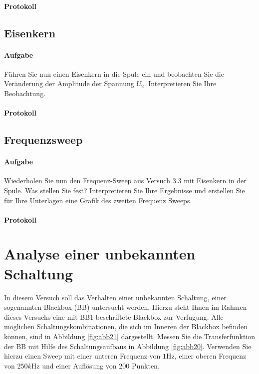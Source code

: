 \documentclass[10pt]{report}
\begin{document}
        \paragraph{Protokoll}


        \subsection{Eisenkern}
        \paragraph{Aufgabe}
        Führen Sie nun einen Eisenkern in die Spule ein und beobachten Sie die Veränderung
        der Amplitude der Spannung $U_2$. Interpretieren Sie Ihre Beobachtung.

        \paragraph{Protokoll}


        \subsection{Frequenzsweep}
        \paragraph{Aufgabe}
        Wiederholen Sie nun den Frequenz-Sweep aus Versuch 3.3 mit Eisenkern in der
        Spule. Was stellen Sie fest? Interpretieren Sie Ihre Ergebnisse und erstellen Sie für
        Ihre Unterlagen eine Grafik des zweiten Frequenz Sweeps.

        \paragraph{Protokoll}


        \section{Analyse einer unbekannten Schaltung}
        In diesem Versuch soll das Verhalten einer unbekannten Schaltung, einer sogenannten
        Blackbox (BB) untersucht werden. Hierzu steht Ihnen im Rahmen dieses Versuchs eine
        mit BB1 beschriftete Blackbox zur Verfugung. Alle möglichen Schaltungskombinationen,
        die sich im Inneren der Blackbox befinden können, sind in Abbildung \ref{fig:abb21} dargestellt.
        Messen Sie die Transferfunktion der BB mit Hilfe des Schaltungsaufbaus in Abbildung
        \ref{fig:abb20}. Verwenden Sie hierzu einen Sweep mit einer unteren Frequenz von $1\si{\hertz}$, einer oberen
        Frequenz von $250\si{k\hertz}$ und einer Auflösung von $200$ Punkten.
\end{document}

